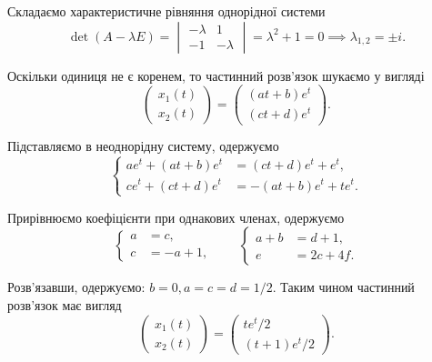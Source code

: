 \begin{solution}
	Складаємо характеристичне рівняння однорідної системи
	\begin{equation*}
		\det (A - \lambda E) = \begin{vmatrix} - \lambda & 1 \\ -1 & - \lambda \end{vmatrix} = \lambda^2 + 1 = 0 \implies \lambda_{1, 2} = \pm i.
	\end{equation*}

	Оскільки одиниця не є коренем, то частинний розв'язок шукаємо у вигляді
	\begin{equation*}
		\begin{pmatrix} x_1(t) \\ x_2(t) \end{pmatrix} = \begin{pmatrix} (a t + b) e^t \\ (c t + d) e^t \end{pmatrix}.
	\end{equation*}

	Підставляємо в неоднорідну систему, одержуємо
	\begin{equation*}
		\left\{
			\begin{aligned}
				a e^t + (a t + b) e^t &= (c t + d) e^t + e^t, \\
				c e^t + (c t + d) e^t &= - (a t + b) e^t + t e^t.
			\end{aligned}
		\right.
	\end{equation*}

	Прирівнюємо коефіцієнти при однакових членах, одержуємо
	\begin{equation*}
		\left\{
			\begin{aligned}
				a &= c, \\
				c &= - a + 1, 
			\end{aligned}
		\right. \qquad \left\{
			\begin{aligned}
				a + b &= d + 1, \\
				e &= 2 c + 4 f.
			\end{aligned}
		\right.
	\end{equation*}

	Розв'язавши, одержуємо: $b = 0, a = c = d = 1 / 2$. Таким чином частинний розв'язок має вигляд
	\begin{equation*}
		\begin{pmatrix} x_1(t) \\ x_2(t) \end{pmatrix} = \begin{pmatrix} t e^t / 2 \\ (t + 1) e^t / 2 \end{pmatrix}.
	\end{equation*}
\end{solution}

